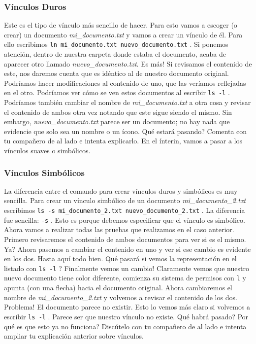 \documentclass[10pt,letterpaper]{article}
\newcommand{\inlinecode}[1]{
\colorbox{light-gray}{\texttt{#1}}
}
\begin{document}
\subsubsection{V\'inculos Duros}
Este es el tipo de v\'inculo m\'as sencillo de hacer. Para esto vamos a escoger (o crear) un documento \emph{mi\_documento.txt} y vamos a crear un v\'inculo de \'el. Para ello escribimos \inlinecode{ln mi\_documento.txt nuevo\_documento.txt}. Si ponemos atenci\'on, dentro de nuestra carpeta donde estaba el documento, acaba de aparecer otro llamado \emph{nuevo\_documento.txt}. Es m\'as! Si revisamos el contenido de este, nos daremos cuenta que es id\'entico al de nuestro documento original. Podr\'iamos hacer modificaciones al contenido de uno, que las ver\'iamos reflejadas en el otro. Podr\'iamos ver c\'omo se ven estos documentos al escribir \inlinecode{ls -l}. Podr\'iamos tambi\'en cambiar el nombre de \emph{mi\_documento.txt} a otra cosa y revisar el contenido de ambos otra vez notando que este sigue siendo el mismo. Sin embargo, \emph{nuevo\_documento.txt} parece ser un documento; no hay nada que evidencie que solo sea un nombre o un \'icono. Qu\'e estar\'a pasando? Comenta con tu compa\~nero de al lado e intenta explicarlo. En el \'interin, vamos a pasar a los v\'inculos suaves o simb\'olicos.

\subsubsection{V\'inculos Simb\'olicos}
La diferencia entre el comando para crear v\'inculos duros y simb\'olicos es muy sencilla. Para crear un v\'inculo simb\'olico de un documento \emph{mi\_documento\_2.txt} escribimos \inlinecode{ls -s mi\_documento\_2.txt nuevo\_documento\_2.txt}. La diferencia fue sencilla: \inlinecode{-s}. Esto es porque debemos especificar que el v\'inculo es simb\'olico. Ahora vamos a realizar todas las pruebas que realizamos en el caso anterior. Primero revisaremos el contenido de ambos documentos para ver si es el mismo. Ya? Ahora pasemos a cambiar el contenido en uno y ver si ese cambio es evidente en los dos. Hasta aqu\'i todo bien. Qu\'e pasar\'a si vemos la representaci\'on en el listado con \inlinecode{ls -l}? Finalmente vemos un cambio! Claramente vemos que nuestro nuevo documento tiene color diferente, comienza su sistema de permisos con \inlinecode{l} y apunta (con una flecha) hacia el documento original. Ahora cambiaremos el nombre de \emph{mi\_documento\_2.txt} y volvemos a revisar el contenido de los dos. Problema! El documento parece no existir. Esto lo vemos m\'as claro si volvemos a escribir \inlinecode{ls -l}. Parece ser que nuestro v\'inculo no existe. Qu\'e habr\'a pasado? Por qu\'e es que esto ya no funciona? Disc\'utelo con tu compa\~nero de al lado e intenta ampliar tu explicaci\'on anterior sobre v\'inculos.
\end{document}

